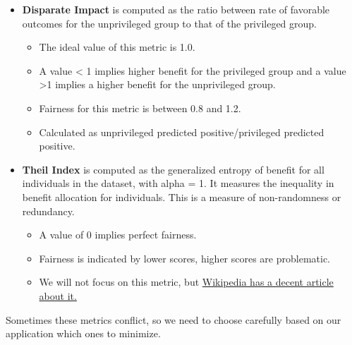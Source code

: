 \documentclass[assignment03_Solutions]{subfiles}
\begin{document}
\begin{itemize}
\begin{itemize}
    \end{itemize}
    \item \textbf{Disparate Impact} is computed as the ratio between rate of favorable outcomes for the unprivileged group to that of the privileged group.
    \begin{itemize}
        \item The ideal value of this metric is 1.0.
        \item A value < 1 implies higher benefit for the privileged group and a value >1 implies a higher benefit for the unprivileged group.
        \item Fairness for this metric is between 0.8 and 1.2.
        \item Calculated as unprivileged predicted positive/privileged predicted positive.
    \end{itemize}
    \item \textbf{Theil Index} is computed as the generalized entropy of benefit for all individuals in the dataset, with alpha = 1. It measures the inequality in benefit allocation for individuals. This is a measure of non-randomness or redundancy.
    \begin{itemize}
        \item A value of 0 implies perfect fairness.
        \item Fairness is indicated by lower scores, higher scores are problematic.
        \item We will not focus on this metric, but \href{https://en.wikipedia.org/wiki/Theil_index}{Wikipedia has a decent article about it.}
    \end{itemize}
\end{itemize}

Sometimes these metrics conflict, so we need to choose carefully based on our application which ones to minimize. 
\end{document}
